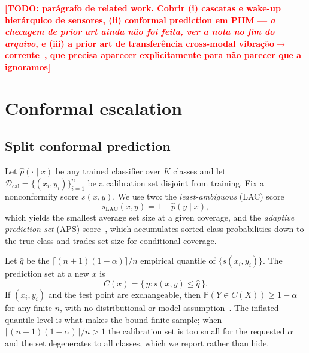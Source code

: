 \documentclass[conference,10pt]{IEEEtran}          %
\newcommand{\TODO}[1]{\textcolor{red}{\textbf{[TODO: #1]}}}
\begin{document}
\TODO{parágrafo de related work. Cobrir (i) cascatas e wake-up hierárquico
de sensores, (ii) conformal prediction em PHM --- \emph{a checagem de prior
art ainda não foi feita, ver a nota no fim do arquivo}, e (iii) a prior art
de transferência cross-modal vibração$\rightarrow$corrente~\cite{momd},
que precisa aparecer explicitamente para não parecer que a ignoramos}

\section{Conformal escalation}

\subsection{Split conformal prediction}
Let $\hat p(\cdot \mid x)$ be any trained classifier over $K$ classes and
let $\mathcal{D}_{\mathrm{cal}} = \{(x_i,y_i)\}_{i=1}^{n}$ be a calibration
set disjoint from training. Fix a nonconformity score $s(x,y)$. We use two:
the \emph{least-ambiguous} (LAC) score~\cite{sadinle2019}
\begin{equation}
s_{\mathrm{LAC}}(x,y) = 1 - \hat p(y \mid x),
\end{equation}
which yields the smallest average set size at a given coverage, and the
\emph{adaptive prediction set} (APS) score~\cite{romano2020}, which
accumulates sorted class probabilities down to the true class and trades
set size for conditional coverage.

Let $\hat q$ be the $\lceil (n+1)(1-\alpha) \rceil / n$ empirical quantile
of $\{s(x_i,y_i)\}$. The prediction set at a new $x$ is
\begin{equation}
C(x) = \{\, y : s(x,y) \leq \hat q \,\}.
\label{eq:set}
\end{equation}
If $(x_i,y_i)$ and the test point are exchangeable, then
$\mathbb{P}(Y \in C(X)) \geq 1-\alpha$ for any finite $n$, with no
distributional or model assumption~\cite{vovk2005,lei2018}. The inflated
quantile level is what makes the bound finite-sample; when
$\lceil (n+1)(1-\alpha)\rceil / n > 1$ the calibration set is too small for
the requested $\alpha$ and the set degenerates to all classes, which we
report rather than hide.
\end{document}
